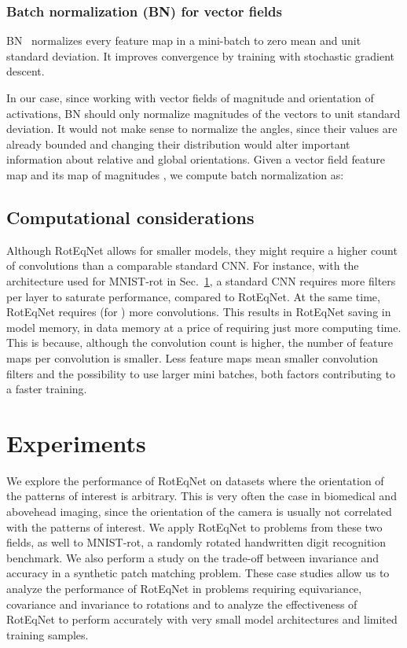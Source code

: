 \documentclass[10pt,twocolumn,letterpaper,table]{article}
\begin{document}
\subsubsection{Batch normalization (BN) for vector fields}
		
BN~\cite{ioffe2015batch} normalizes every feature map in a mini-batch to zero mean and unit standard deviation. It improves convergence by training with stochastic gradient descent.
	
In our case, since working with vector fields of magnitude and orientation of activations, BN should only normalize magnitudes of the vectors to unit standard deviation. It would not make sense to normalize the angles, since their values are already bounded and changing their distribution would alter important information about relative and global orientations. Given a vector field feature map  and its map of magnitudes , we compute batch normalization as:



\subsection{Computational considerations}
Although RotEqNet allows for smaller models, they  might require a higher count of convolutions than a comparable standard CNN. For instance, with the architecture used for MNIST-rot in Sec.~\ref{sec:exp}, a standard CNN requires  more filters per layer to saturate performance, compared to RotEqNet. At the same time, RotEqNet requires  (for ) more convolutions. This results in RotEqNet saving  in model memory,  in data memory at a price of requiring just  more computing time.
This is because, although the convolution count is higher, the number of feature maps per convolution is smaller. Less feature maps mean smaller convolution filters and  the possibility to use larger mini batches, both factors contributing to a faster training.

\section{Experiments}\label{sec:exp}
	
We explore the performance of RotEqNet on datasets where the orientation of the patterns of interest is arbitrary. This is very often the case in biomedical and abovehead imaging, since the orientation of the camera is usually not correlated with the patterns of interest. We apply RotEqNet to problems from these two fields, as well to MNIST-rot, a randomly rotated handwritten digit recognition benchmark. We also perform a study on the trade-off between invariance and accuracy in a synthetic patch matching problem. These case studies allow us to analyze the performance of RotEqNet in problems requiring equivariance, covariance and invariance to rotations and to analyze the effectiveness of RotEqNet to perform accurately with very small model architectures and limited training samples. 
\end{document}
